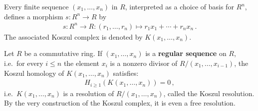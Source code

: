     \begin{example}
        Every finite sequence $(x_1,\ldots,x_n)$ in $R$, interpreted as a choice of basis for $R^n$, defines a morphism $s:R^n\rightarrow R$ by
        \begin{gather}
            s:R^n\rightarrow R:(r_1,\ldots,r_n)\mapsto r_1x_1+\cdots+r_nx_n\,.
        \end{gather}
        The associated Koszul complex is denoted by $K(x_1,\ldots,x_n)$.
    \end{example}
    \begin{property}\label{homalg:koszul_resolution}
        Let $R$ be a commutative ring. If $(x_1,\ldots,x_n)$ is a \textbf{regular sequence} on $R$, i.e.~for every $i\leq n$ the element $x_i$ is a nonzero divisor of $R/(x_1,\ldots,x_{i-1})$, the Koszul homology of $K(x_1,\ldots,x_n)$ satisfies:
        \begin{gather}
            H_{i\geq1}(K(x_1,\ldots,x_n)) = 0\,,
        \end{gather}
        i.e.~$K(x_1,\ldots,x_n)$ is a resolution of $R/(x_1,\ldots,x_n)$, called the Koszul resolution. By the very construction of the Koszul complex, it is even a free resolution.
    \end{property}

